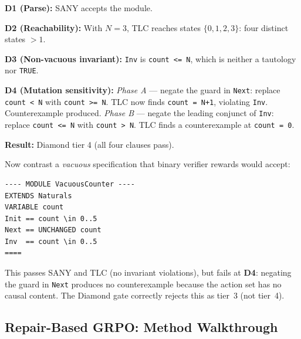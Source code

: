 \documentclass[11pt]{article}
\begin{document}
\noindent \textbf{D1 (Parse):} SANY accepts the module. \checkmark

\noindent \textbf{D2 (Reachability):} With $N=3$, TLC reaches states
$\{0, 1, 2, 3\}$: four distinct states $> 1$. \checkmark

\noindent \textbf{D3 (Non-vacuous invariant):} \texttt{Inv} is
\texttt{count <= N}, which is neither a tautology nor \texttt{TRUE}.
\checkmark

\noindent \textbf{D4 (Mutation sensitivity):}
\emph{Phase A} --- negate the guard in \texttt{Next}: replace
\texttt{count < N} with \texttt{count >= N}. TLC now finds
\texttt{count = N+1}, violating \texttt{Inv}. Counterexample produced.
\emph{Phase B} --- negate the leading conjunct of \texttt{Inv}: replace
\texttt{count <= N} with \texttt{count > N}. TLC finds a
counterexample at \texttt{count = 0}. \checkmark

\noindent \textbf{Result:} Diamond tier 4 (all four clauses pass).

\medskip
\noindent Now contrast a \emph{vacuous} specification that binary
verifier rewards would accept:

\begin{tcolorbox}[
  enhanced, colback=c4!8, colframe=c4, boxrule=0.5pt,
  arc=2pt, left=6pt, right=6pt, top=3pt, bottom=3pt,
  title=\textbf{Vacuous counter (fails Diamond gate)}, fonttitle=\small,
]
\begin{verbatim}
---- MODULE VacuousCounter ----
EXTENDS Naturals
VARIABLE count
Init == count \in 0..5
Next == UNCHANGED count
Inv  == count \in 0..5
====
\end{verbatim}
\end{tcolorbox}

\noindent This passes SANY and TLC (no invariant violations), but fails
at \textbf{D4}: negating the guard in \texttt{Next} produces no
counterexample because the action set has no causal content. The Diamond
gate correctly rejects this as tier~3 (not tier~4).

\subsection{Repair-Based GRPO: Method Walkthrough}
\label{sec:app-repair-walkthrough}
\end{document}

